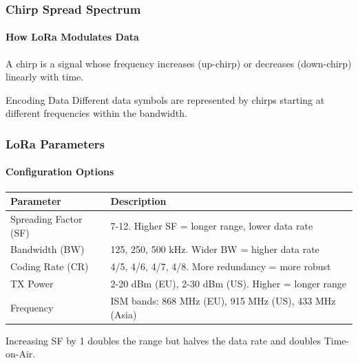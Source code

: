 \documentclass{beamer}
\begin{document}
\begin{frame}
\frametitle{Chirp Spread Spectrum}
\framesubtitle{How LoRa Modulates Data}

\begin{definition}[Chirp]
A chirp is a signal whose frequency increases (up-chirp) or decreases (down-chirp) linearly with time.
\end{definition}

\vspace{0.5em}

\begin{center}
\end{center}

\begin{exampleblock}{Encoding Data}
Different data symbols are represented by chirps starting at different frequencies within the bandwidth.
\end{exampleblock}
\end{frame}

\begin{frame}
\frametitle{LoRa Parameters}
\framesubtitle{Configuration Options}

\begin{table}
\small
\begin{tabular}{|l|p{6cm}|}
\hline
\textbf{Parameter} & \textbf{Description} \\
\hline
Spreading Factor (SF) & 7-12. Higher SF = longer range, lower data rate \\
\hline
Bandwidth (BW) & 125, 250, 500 kHz. Wider BW = higher data rate \\
\hline
Coding Rate (CR) & 4/5, 4/6, 4/7, 4/8. More redundancy = more robust \\
\hline
TX Power & 2-20 dBm (EU), 2-30 dBm (US). Higher = longer range \\
\hline
Frequency & ISM bands: 868 MHz (EU), 915 MHz (US), 433 MHz (Asia) \\
\hline
\end{tabular}
\end{table}

\vspace{1em}

\begin{theorem}
Increasing SF by 1 doubles the range but halves the data rate and doubles Time-on-Air.
\end{theorem}
\end{frame}
\end{document}
